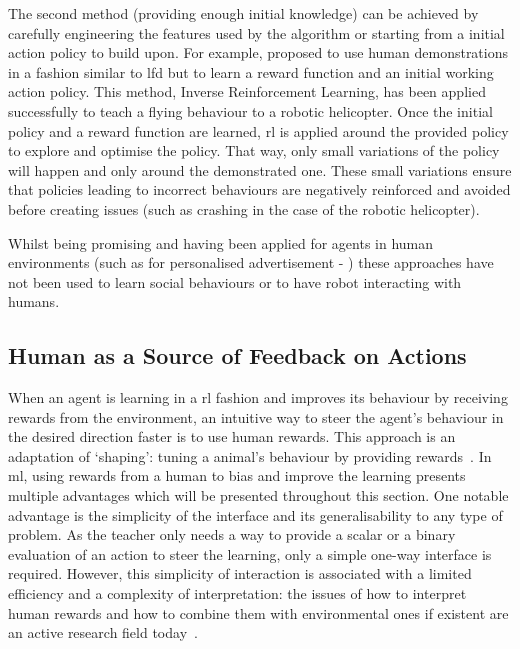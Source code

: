 	The second method (providing enough initial knowledge) can be achieved by carefully engineering the features used by the algorithm or starting from a initial action policy to build upon. For example, \cite{abbeel2004apprenticeship} proposed to use human demonstrations in a fashion similar to \gls{lfd} but to learn a reward function and an initial working action policy. This method, Inverse Reinforcement Learning, has been applied successfully to teach a flying behaviour to a robotic helicopter. Once the initial policy and a reward function are learned, \gls{rl} is applied around the provided policy to explore and optimise the policy. That way, only small variations of the policy will happen and only around the demonstrated one. These small variations ensure that policies leading to incorrect behaviours are negatively reinforced and avoided before creating issues (such as crashing in the case of the robotic helicopter). 
	
	
	Whilst being promising and having been applied for agents in human environments (such as for personalised advertisement - \citealt{theocharous2015personalized})	these approaches have not been used to learn social behaviours or to have robot interacting with humans.

\subsection{Human as a Source of Feedback on Actions} \label{ssec:back_feedback}

When an agent is learning in a \gls{rl} fashion and improves its behaviour by receiving rewards from the environment, an intuitive way to steer the agent's behaviour in the desired direction faster is to use human rewards. This approach is an adaptation of `shaping': tuning a animal's behaviour by providing rewards~\citep{bouton2007learning}. In \gls{ml}, using rewards from a human to bias and improve the learning presents multiple advantages which will be presented throughout this section. One notable advantage is the simplicity of the interface and its generalisability to any type of problem. As the teacher only needs a way to provide a scalar or a binary evaluation of an action to steer the learning, only a simple one-way interface is required.  However, this simplicity of interaction is associated with a limited efficiency and a complexity of interpretation: the issues of how to interpret human rewards and how to combine them with environmental ones if existent are an active research field today~\citep{knox2010combining}.

